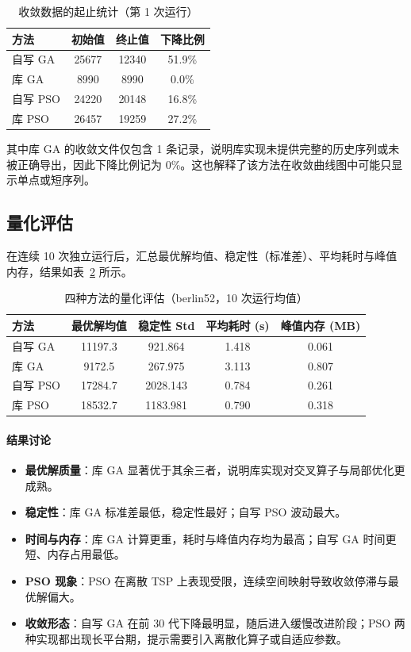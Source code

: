 \documentclass[runningheads]{ctexart}
\begin{document}
\begin{table}[H]
	\centering
	\caption{收敛数据的起止统计（第 1 次运行）}
	\label{tab:convstat}
	\begin{tabular}{lccc}
		\toprule
		方法 & 初始值 & 终止值 & 下降比例 \\
		\midrule
		自写 GA & 25677 & 12340 & 51.9\% \\
		库 GA & 8990 & 8990 & 0.0\% \\
		自写 PSO & 24220 & 20148 & 16.8\% \\
		库 PSO & 26457 & 19259 & 27.2\% \\
		\bottomrule
	\end{tabular}
\end{table}
其中库 GA 的收敛文件仅包含 1 条记录，说明库实现未提供完整的历史序列或未被正确导出，因此下降比例记为 0\%。这也解释了该方法在收敛曲线图中可能只显示单点或短序列。

\subsection{量化评估}
在连续 10 次独立运行后，汇总最优解均值、稳定性（标准差）、平均耗时与峰值内存，结果如表~\ref{tab:summary} 所示。

\begin{table}[H]
	\centering
	\caption{四种方法的量化评估（berlin52，10 次运行均值）}
	\label{tab:summary}
	\begin{tabular}{lcccc}
		\toprule
		方法 & 最优解均值 & 稳定性 Std & 平均耗时 (s) & 峰值内存 (MB) \\
		\midrule
		自写 GA & 11197.3 & 921.864 & 1.418 & 0.061 \\
		库 GA & 9172.5 & 267.975 & 3.113 & 0.807 \\
		自写 PSO & 17284.7 & 2028.143 & 0.784 & 0.261 \\
		库 PSO & 18532.7 & 1183.981 & 0.790 & 0.318 \\
		\bottomrule
	\end{tabular}
\end{table}

\paragraph{结果讨论}
\begin{itemize}
	\item \textbf{最优解质量}：库 GA 显著优于其余三者，说明库实现对交叉算子与局部优化更成熟。
	\item \textbf{稳定性}：库 GA 标准差最低，稳定性最好；自写 PSO 波动最大。
	\item \textbf{时间与内存}：库 GA 计算更重，耗时与峰值内存均为最高；自写 GA 时间更短、内存占用最低。
	\item \textbf{PSO 现象}：PSO 在离散 TSP 上表现受限，连续空间映射导致收敛停滞与最优解偏大。
    \item \textbf{收敛形态}：自写 GA 在前 30 代下降最明显，随后进入缓慢改进阶段；PSO 两种实现都出现长平台期，提示需要引入离散化算子或自适应参数。
\end{itemize}
\end{document}
